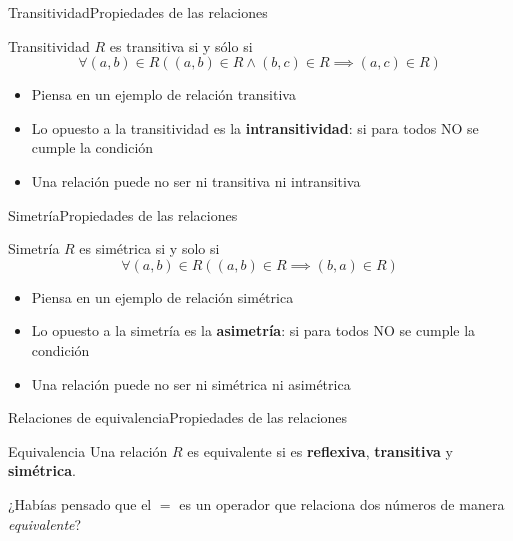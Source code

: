 \documentclass[spanish, c]{beamer}
\begin{document}
\begin{frame}{Transitividad}{Propiedades de las relaciones}

    \begin{block}{Transitividad}
        $R$ es \alert{transitiva} si y sólo si
        $$\forall(a,b) \in R\left((a,b) \in R \wedge (b,c) \in R \implies (a,c) \in R\right)$$
    \end{block} \pause

    \bigskip

    \begin{itemize}
        \item Piensa en un ejemplo de relación transitiva
        \item Lo opuesto a la transitividad es la \textbf{intransitividad}: si para todos NO se cumple la condición
        \item Una relación puede no ser ni transitiva ni intransitiva
    \end{itemize}

\end{frame}

\begin{frame}{Simetría}{Propiedades de las relaciones}

    \begin{block}{Simetría}
        $R$ es \alert{simétrica} si y solo si
        $$\forall(a,b) \in R\left( (a, b) \in R \implies (b, a) \in R \right)$$
    \end{block} \pause
    
    \bigskip

    \begin{itemize}
        \item Piensa en un ejemplo de relación simétrica
        \item Lo opuesto a la simetría es la \textbf{asimetría}: si para todos NO se cumple la condición
        \item Una relación puede no ser ni simétrica ni asimétrica
    \end{itemize}

\end{frame}

\begin{frame}{Relaciones de equivalencia}{Propiedades de las relaciones}

    \begin{block}{Equivalencia}
        Una relación $R$ es \alert{equivalente} si es \textbf{reflexiva}, \textbf{transitiva} y \textbf{simétrica}.
    \end{block} \pause

    \bigskip

    ¿Habías pensado que el $=$ es un operador que relaciona dos números de manera \textit{equivalente}?

\end{frame}
\end{document}
